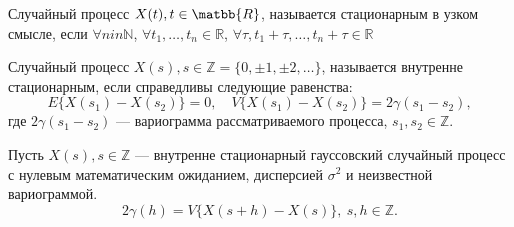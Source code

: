 Случайный процесс $ X(t), t \in \matbb{R} $, называется стационарным в узком смысле, если $ \forall n in \mathbb{N} $, $ \forall t_1, \dots, t_n \in \mathbb{R} $, $ \forall \tau, t_1 + \tau, \dots, t_n + \tau \in \mathbb{R} $

Случайный процесс $ X(s), s \in \mathbb{Z} = \{0, \pm 1, \pm 2, \dots \} $, называется внутренне стационарным, если справедливы следующие равенства:
\begin{equation*}
	E \{ X(s_1) - X(s_2) \} = 0, \quad V \{ X(s_1) - X(s_2) \} = 2 \gamma(s_1 - s_2),
\end{equation*}
где $2 \gamma(s_1 - s_2)$ --- вариограмма рассматриваемого процесса, $s_1,s_2 \in \mathbb{Z}$.

Пусть $ X(s), s \in \mathbb{Z} $ --- внутренне стационарный гауссовский случайный процесс с нулевым математическим ожиданием, дисперсией $ \sigma^2 $ и неизвестной вариограммой.
\begin{equation*}
	2 \gamma(h) = V \{ X(s+h) - X(s) \}, ~ s,h \in \mathbb{Z}.
\end{equation*}